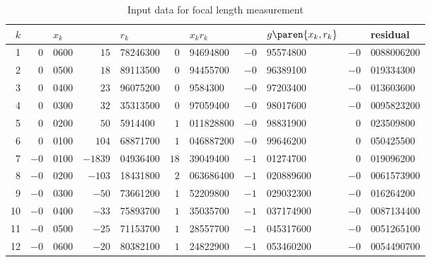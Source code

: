 \begin{table}[t]
	\begin{center}
		\begin{tabular}{rr@{.}lr@{.}lr@{.}lr@{.}lr@{.}l}
		  $k$ && $x_{k}$ && $r_{k}$ && $x_{k}r_{k}$ && $g\paren{x_{k},r_{k}}$ && residual \\\hline
1 & $0$ & 0600 & $15$ & 78246300 & $0$ & 94694800 & $-0$ & 95574800 & $-0$ & 0088006200 \\
2 & $0$ & 0500 & $18$ & 89113500 & $0$ & 94455700 & $-0$ & 96389100 & $-0$ & 019334300 \\
3 & $0$ & 0400 & $23$ & 96075200 & $0$ & 9584300 & $-0$ & 97203400 & $-0$ & 013603600 \\
4 & $0$ & 0300 & $32$ & 35313500 & $0$ & 97059400 & $-0$ & 98017600 & $-0$ & 0095823200 \\
5 & $0$ & 0200 & $50$ & 5914400 & $1$ & 011828800 & $-0$ & 98831900 & $0$ & 023509800 \\
6 & $0$ & 0100 & $104$ & 68871700 & $1$ & 046887200 & $-0$ & 99646200 & $0$ & 050425500 \\
7 & $-0$ & 0100 & $-1839$ & 04936400 & $18$ & 39049400 & $-1$ & 01274700 & $0$ & 019096200 \\
8 & $-0$ & 0200 & $-103$ & 18431800 & $2$ & 063686400 & $-1$ & 020889600 & $-0$ & 0061573900 \\
9 & $-0$ & 0300 & $-50$ & 73661200 & $1$ & 52209800 & $-1$ & 029032300 & $-0$ & 016264200 \\
10 & $-0$ & 0400 & $-33$ & 75893700 & $1$ & 35035700 & $-1$ & 037174900 & $-0$ & 0087134400 \\
11 & $-0$ & 0500 & $-25$ & 71153700 & $1$ & 28557700 & $-1$ & 045317600 & $-0$ & 0051265100 \\
12 & $-0$ & 0600 & $-20$ & 80382100 & $1$ & 24822900 & $-1$ & 053460200 & $-0$ & 0054490700 \\[5pt]
		\end{tabular}
	\end{center}
	\caption{Input data for focal length measurement}
	\label{tab:dubious II data and results}
\end{table}%

\endinput  %
